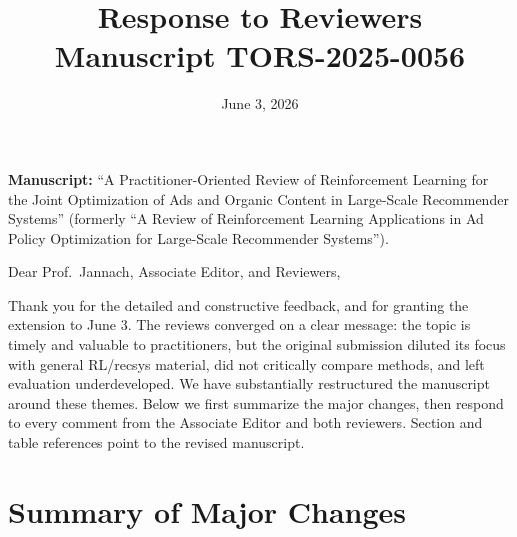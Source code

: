 \documentclass[11pt]{article}
\title{\vspace{-2.5em}Response to Reviewers\\[0.3em]
\large Manuscript TORS-2025-0056}
\author{}
\date{June 3, 2026}
\begin{document}
\maketitle
\vspace{1em}

\noindent\textbf{Manuscript:} ``A Practitioner-Oriented Review of Reinforcement
Learning for the Joint Optimization of Ads and Organic Content in Large-Scale
Recommender Systems'' (formerly ``A Review of Reinforcement Learning
Applications in Ad Policy Optimization for Large-Scale Recommender Systems'').

\bigskip

\noindent Dear Prof.\ Jannach, Associate Editor, and Reviewers,

Thank you for the detailed and constructive feedback, and for granting the
extension to June 3. The reviews converged on a clear message: the topic is
timely and valuable to practitioners, but the original submission diluted its
focus with general RL/recsys material, did not critically compare methods, and
left evaluation underdeveloped. We have substantially restructured the
manuscript around these themes. Below we first summarize the major changes,
then respond to every comment from the Associate Editor and both reviewers.
Section and table references point to the revised manuscript.

\section*{Summary of Major Changes}
\end{document}
